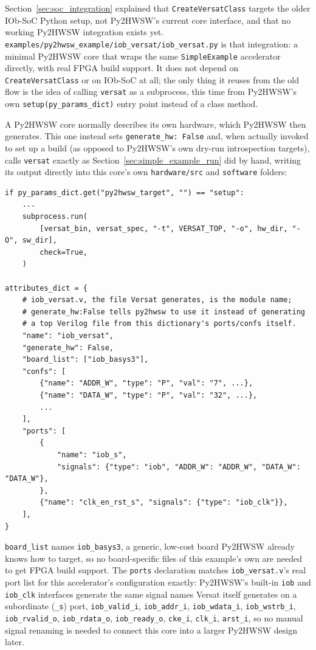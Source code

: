 %

Section~\ref{sec:soc_integration} explained that \texttt{CreateVersatClass} targets the older IOb-SoC Python setup, not Py2HWSW's current core interface, and that no working Py2HWSW integration exists yet. \texttt{examples/py2hwsw\_example/iob\_versat/iob\_versat.py} is that integration: a minimal Py2HWSW core that wraps the same \texttt{SimpleExample} accelerator directly, with real FPGA build support. It does not depend on \texttt{CreateVersatClass} or on IOb-SoC at all; the only thing it reuses from the old flow is the idea of calling \texttt{versat} as a subprocess, this time from Py2HWSW's own \texttt{setup(py\_params\_dict)} entry point instead of a class method.

A Py2HWSW core normally describes its own hardware, which Py2HWSW then generates. This one instead sets \texttt{generate\_hw: False} and, when actually invoked to set up a build (as opposed to Py2HWSW's own dry-run introspection targets), calls \texttt{versat} exactly as Section~\ref{sec:simple_example_run} did by hand, writing its output directly into this core's own \texttt{hardware/src} and \texttt{software} folders:

\begin{lstlisting}[caption={iob\_versat.py (excerpt)}]
if py_params_dict.get("py2hwsw_target", "") == "setup":
    ...
    subprocess.run(
        [versat_bin, versat_spec, "-t", VERSAT_TOP, "-o", hw_dir, "-O", sw_dir],
        check=True,
    )

attributes_dict = {
    # iob_versat.v, the file Versat generates, is the module name;
    # generate_hw:False tells py2hwsw to use it instead of generating
    # a top Verilog file from this dictionary's ports/confs itself.
    "name": "iob_versat",
    "generate_hw": False,
    "board_list": ["iob_basys3"],
    "confs": [
        {"name": "ADDR_W", "type": "P", "val": "7", ...},
        {"name": "DATA_W", "type": "P", "val": "32", ...},
        ...
    ],
    "ports": [
        {
            "name": "iob_s",
            "signals": {"type": "iob", "ADDR_W": "ADDR_W", "DATA_W": "DATA_W"},
        },
        {"name": "clk_en_rst_s", "signals": {"type": "iob_clk"}},
    ],
}
\end{lstlisting}

\texttt{board\_list} names \texttt{iob\_basys3}, a generic, low-cost board Py2HWSW already knows how to target, so no board-specific files of this example's own are needed to get FPGA build support. The \texttt{ports} declaration matches \texttt{iob\_versat.v}'s real port list for this accelerator's configuration exactly: Py2HWSW's built-in \texttt{iob} and \texttt{iob\_clk} interfaces generate the same signal names Versat itself generates on a subordinate (\texttt{\_s}) port, \texttt{iob\_valid\_i}, \texttt{iob\_addr\_i}, \texttt{iob\_wdata\_i}, \texttt{iob\_wstrb\_i}, \texttt{iob\_rvalid\_o}, \texttt{iob\_rdata\_o}, \texttt{iob\_ready\_o}, \texttt{cke\_i}, \texttt{clk\_i}, \texttt{arst\_i}, so no manual signal renaming is needed to connect this core into a larger Py2HWSW design later.

